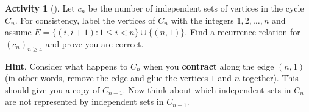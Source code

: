 \documentclass[10pt,]{book}
\newcommand{\terminology}[1]{\textbf{#1}}
\theoremstyle{plain}
\theoremstyle{definition}
\theoremstyle{definition}
\theoremstyle{definition}
\newtheorem{activity}[project]{Activity}
\theoremstyle{definition}
\numberwithin{equation}{chapter}
\def\st{:}
\newcommand{\lt}{<}
\begin{document}
\begin{activity}[]\label{activity-83}
\hypertarget{p-817}{}%
Let \(c_n\) be the number of independent sets of vertices in the cycle \(C_n\).  For consistency, label the vertices of \(C_n\) with the integers \(1, 2, \ldots, n\) and assume \(E = \{(i, i+1) \st 1 \le i \lt n\} \cup \{(n, 1)\}\). Find a recurrence relation for \((c_n)_{n\ge 4}\) and prove you are correct.%
\par\smallskip%
\noindent\textbf{Hint}.\hypertarget{hint-76}{}\quad%
\hypertarget{p-818}{}%
Consider what happens to \(C_n\) when you \terminology{contract} along the edge \((n,1)\) (in other words, remove the edge and glue the vertices \(1\) and \(n\) together).  This should give you a copy of \(C_{n-1}\).  Now think about which independent sets in \(C_n\) are not represented by independent sets in \(C_{n-1}\).%
\end{activity}
\end{document}
